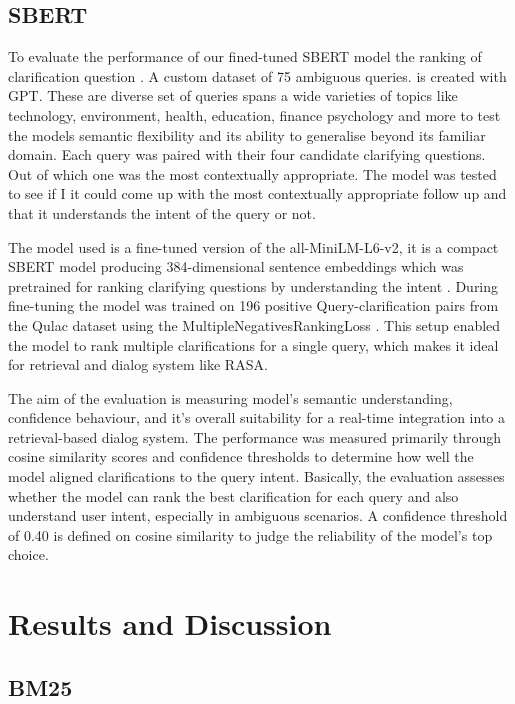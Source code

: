 \documentclass[11pt]{article}
\begin{document}
\subsection{SBERT}
To evaluate the performance of our fined-tuned SBERT model the ranking of clarification question \cite{Tomaarsen2025b}. A custom dataset of 75 ambiguous queries.  is created with GPT. These are diverse set of queries spans a wide varieties of topics like technology, environment, health, education, finance psychology and more to test the models semantic flexibility and its ability to generalise beyond its familiar domain. Each query was paired with their four candidate clarifying questions. Out of which one was the most contextually appropriate.  The model was tested to see if I it could come up with the most contextually appropriate follow up and that it understands the intent of the query or not. 

The model used is a fine-tuned version of the all-MiniLM-L6-v2, it is a compact SBERT model producing 384-dimensional sentence embeddings which was pretrained for ranking clarifying questions by understanding the intent \cite{Tomaarsen2025a}. During fine-tuning the model was trained on 196 positive Query-clarification pairs from the Qulac dataset using the MultipleNegativesRankingLoss \cite{Tomaarsen2025c}. This setup enabled the model to rank multiple clarifications for a single query, which makes it ideal for retrieval and dialog system like RASA. 

The aim of the evaluation is measuring model's semantic understanding, confidence behaviour, and it's overall suitability for a real-time integration into a retrieval-based dialog system. The performance was measured primarily through cosine similarity scores and confidence thresholds to determine how well the model aligned clarifications to the query intent.
Basically, the evaluation assesses whether the model can rank the best clarification for each query and also understand user intent, especially in ambiguous scenarios. A confidence threshold of 0.40 is defined on cosine similarity to judge the reliability of the model's top choice.

\section{Results and Discussion}
\subsection{BM25}
\end{document}
